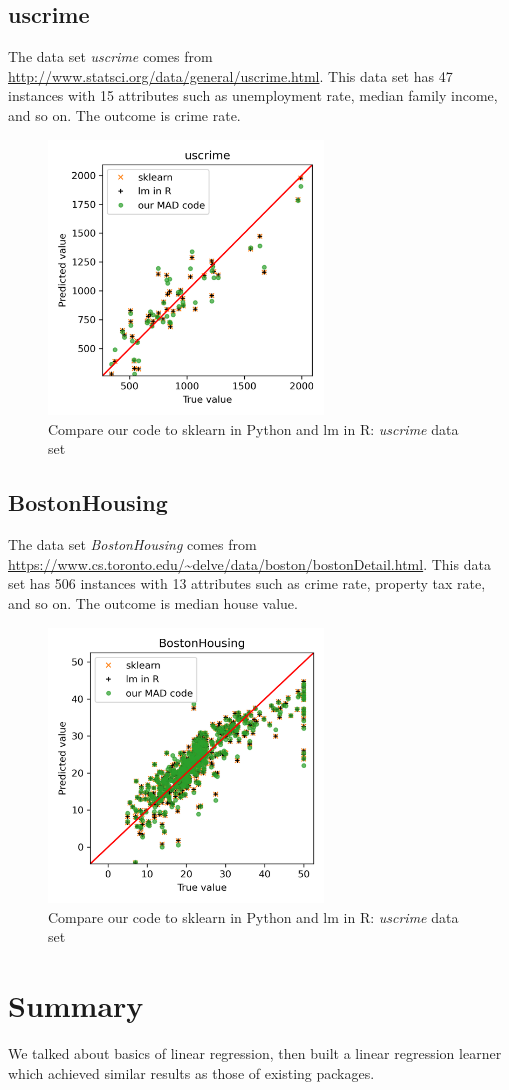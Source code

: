 \documentclass[
	letterpaper
]{article}
\begin{document}
\subsection{uscrime}
The data set \textit{uscrime} comes from \url{http://www.statsci.org/data/general/uscrime.html}.
This data set has 47 instances with 15 attributes such as unemployment rate, median family income, and so on. The outcome is crime rate.
\begin{figure}[htbp]
	\centering
	\includegraphics[width=0.65\textwidth]{figures/compare-uscrime.png}
	\caption{Compare our code to sklearn in Python and lm in R: \textit{uscrime} data set}
	\label{fig:compare-crime}
\end{figure}

\subsection{BostonHousing}
The data set \textit{BostonHousing} comes from \url{https://www.cs.toronto.edu/~delve/data/boston/bostonDetail.html}.
This data set has 506 instances with 13 attributes such as crime rate, property tax rate, and so on. The outcome is median house value.
\begin{figure}[htbp]
	\centering
	\includegraphics[width=0.65\textwidth]{figures/compare-BostonHousing.png}
	\caption{Compare our code to sklearn in Python and lm in R: \textit{uscrime} data set}
	\label{fig:compare-boston}
\end{figure}

\section{Summary}
We talked about basics of linear regression, then built a linear regression learner which achieved similar results as those of existing packages.
\end{document}
